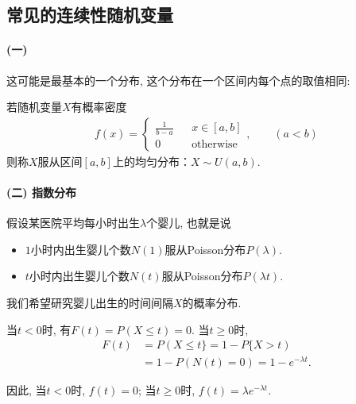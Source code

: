\subsection{常见的连续性随机变量}

\paragraph{(一) }

这可能是最基本的一个分布, 这个分布在一个区间内每个点的取值相同:

\begin{definition}
    若随机变量$X$有概率密度
    \begin{align*}
        f(x)=\left\{\begin{array}{lcl}
                        \frac1{b-a} &  & x\in [a,b]       \\
                        0           &  & \mbox{otherwise}
                    \end{array}\right. ,\qquad (a<b)
    \end{align*}
    则称$X$服从区间$[a,b]$上的均匀分布：$X\sim U(a,b)$.
\end{definition}%


\paragraph{(二) 指数分布}

假设某医院平均每小时出生$\lambda$个婴儿, 也就是说
\begin{itemize}
    \item $1$小时内出生婴儿个数$N(1)$服从Poisson分布$P(\lambda)$. 
    \item $t$小时内出生婴儿个数$N(t)$服从Poisson分布$P(\lambda t)$. 
\end{itemize}
我们希望研究婴儿出生的时间间隔$X$的概率分布. 


当$t<0$时, 有$F(t)=P(X\le t)=0$.  当$t\ge0$时, 
\begin{align*}
    F(t) & =P(X\le t\}=1-P\{X>t)          \\
         & =1-P(N(t)=0)=1-e^{-\lambda t}.
\end{align*}

因此, 当$t<0$时, $f(t)=0$;  当$t\ge0$时, $f(t)=\lambda e^{-\lambda t}$. 

